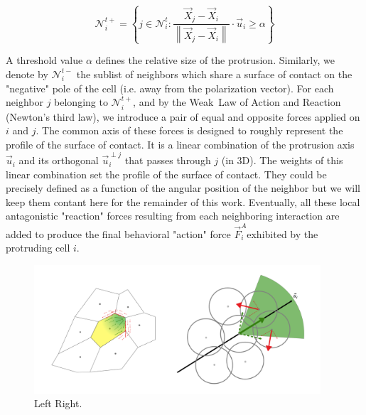 $$\mathcal{N}^{t+}_i = \left\{ j \in \mathcal{N}^t_i : \frac{\vec{X}_j - \vec{X}_i}{\left\|\vec{X}_j - \vec{X}_i\right\|} \cdot \vec{u}_i \geq \alpha \right\}$$

A threshold value $\alpha$ defines the relative size of the protrusion. Similarly, we denote by $\mathcal{N}^{t-}_i$ the sublist of neighbors which share a surface of contact on the "negative" pole of the cell (i.e. away from the polarization vector). For each neighbor $j$ belonging to $\mathcal{N}^{t+}_i$, and by the Weak Law of Action and Reaction (Newton's third law), we introduce a pair of equal and opposite forces applied on $i$ and $j$. The common axis of these forces is designed to roughly represent the profile of the surface of contact. It is a linear combination of the protrusion axis $\vec{u}_i$ and its orthogonal $\vec{u}^{\perp j}_i$ that passes through $j$ (in 3D). The weights of this linear combination set the profile of the surface of contact. They could be precisely defined as a function of the angular position of the neighbor but we will keep them contant here for the remainder of this work. Eventually, all these local antagonistic "reaction" forces resulting from each neighboring interaction are added to produce the final behavioral "action" force $\vec{F}^A_i$exhibited by the protruding cell $i$.
\begin{figure}
\begin{center}
\includegraphics[width=0.95\textwidth]{../../images/MECAGEN/protrusion/protrusion_schematic_figure.png}
\end{center}
\caption{Left Right.}
\label{protrusion_protrusion_schematic_figure}
\end{figure}
